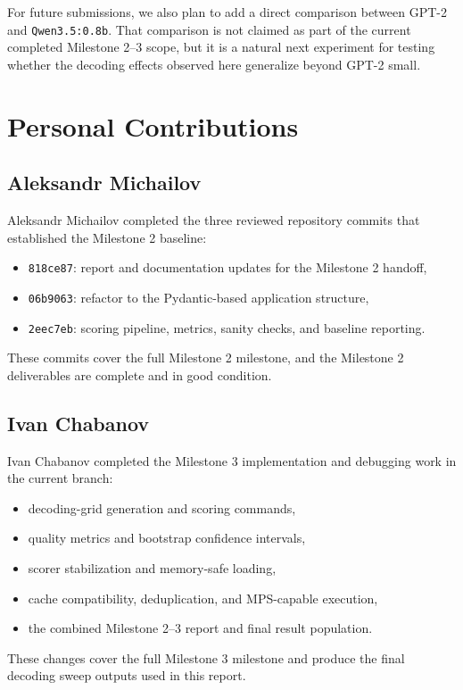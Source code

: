 \documentclass[11pt]{article}
\begin{document}
For future submissions, we also plan to add a direct comparison between GPT-2
and \texttt{Qwen3.5:0.8b}. That comparison is not claimed as part of the current
completed Milestone 2--3 scope, but it is a natural next experiment for testing
whether the decoding effects observed here generalize beyond GPT-2 small.

\section{Personal Contributions}
\subsection*{Aleksandr Michailov}
Aleksandr Michailov completed the three reviewed repository commits that
established the Milestone 2 baseline:
\begin{itemize}
\item \texttt{818ce87}: report and documentation updates for the Milestone 2 handoff,
\item \texttt{06b9063}: refactor to the Pydantic-based application structure,
\item \texttt{2eec7eb}: scoring pipeline, metrics, sanity checks, and baseline reporting.
\end{itemize}
These commits cover the full Milestone 2 milestone, and the Milestone 2 deliverables are
complete and in good condition.

\subsection*{Ivan Chabanov}
Ivan Chabanov completed the Milestone 3 implementation and debugging work in the
current branch:
\begin{itemize}
\item decoding-grid generation and scoring commands,
\item quality metrics and bootstrap confidence intervals,
\item scorer stabilization and memory-safe loading,
\item cache compatibility, deduplication, and MPS-capable execution,
\item the combined Milestone 2--3 report and final result population.
\end{itemize}
These changes cover the full Milestone 3 milestone and produce the final decoding
sweep outputs used in this report.
\end{document}
